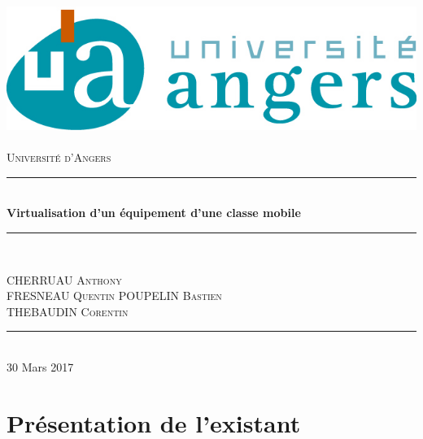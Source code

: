 \documentclass[a4paper,12pt]{article}
\newcommand{\HRule}{\rule{\linewidth}{0.5mm}}
\begin{document}
\begin{titlepage}
  \begin{sffamily}
  \begin{center}

    \includegraphics[scale=1]{univangers.jpg}~\\[1.5cm]

    \textsc{\LARGE Université d'Angers}\\[2cm]

   

    \HRule \\[0.4cm]
    { \huge \bfseries Virtualisation d'un équipement d'une classe mobile}{\bfseries  \\[0.4cm] }

    \HRule \\[2cm]
    

    \begin{minipage}{0.4\textwidth}
      \begin{flushleft} \large
        CHERRUAU \textsc{Anthony}\\
        FRESNEAU \textsc{Quentin}
        POUPELIN \textsc{Bastien}\\
        THEBAUDIN \textsc{Corentin}
      \end{flushleft}
    \end{minipage}
    

    \vfill
    \HRule\\[2cm]
    {\large 30 Mars 2017}

  \end{center}
  \end{sffamily}
\end{titlepage}
\clearpage

\tableofcontents

\clearpage



\section{Présentation de l'existant}
\end{document}
